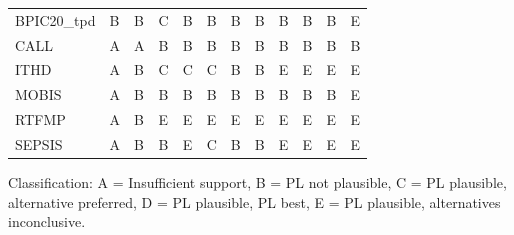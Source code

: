 \begin{tabular}{llllllllllll}
BPIC20\_tpd & \cellcolor[HTML]{D55E00} B & \cellcolor[HTML]{D55E00} B & \cellcolor[HTML]{E69F00} C & \cellcolor[HTML]{D55E00} B & \cellcolor[HTML]{D55E00} B & \cellcolor[HTML]{D55E00} B & \cellcolor[HTML]{D55E00} B & \cellcolor[HTML]{D55E00} B & \cellcolor[HTML]{D55E00} B & \cellcolor[HTML]{D55E00} B & \cellcolor[HTML]{56B4E9} E \\
       CALL & \cellcolor[HTML]{FFFFFF} A & \cellcolor[HTML]{FFFFFF} A & \cellcolor[HTML]{D55E00} B & \cellcolor[HTML]{D55E00} B & \cellcolor[HTML]{D55E00} B & \cellcolor[HTML]{D55E00} B & \cellcolor[HTML]{D55E00} B & \cellcolor[HTML]{D55E00} B & \cellcolor[HTML]{D55E00} B & \cellcolor[HTML]{D55E00} B & \cellcolor[HTML]{D55E00} B \\
       ITHD & \cellcolor[HTML]{FFFFFF} A & \cellcolor[HTML]{D55E00} B & \cellcolor[HTML]{E69F00} C & \cellcolor[HTML]{E69F00} C & \cellcolor[HTML]{E69F00} C & \cellcolor[HTML]{D55E00} B & \cellcolor[HTML]{D55E00} B & \cellcolor[HTML]{56B4E9} E & \cellcolor[HTML]{56B4E9} E & \cellcolor[HTML]{56B4E9} E & \cellcolor[HTML]{56B4E9} E \\
      MOBIS & \cellcolor[HTML]{FFFFFF} A & \cellcolor[HTML]{D55E00} B & \cellcolor[HTML]{D55E00} B & \cellcolor[HTML]{D55E00} B & \cellcolor[HTML]{D55E00} B & \cellcolor[HTML]{D55E00} B & \cellcolor[HTML]{D55E00} B & \cellcolor[HTML]{D55E00} B & \cellcolor[HTML]{D55E00} B & \cellcolor[HTML]{D55E00} B & \cellcolor[HTML]{56B4E9} E \\
      RTFMP & \cellcolor[HTML]{FFFFFF} A & \cellcolor[HTML]{D55E00} B & \cellcolor[HTML]{56B4E9} E & \cellcolor[HTML]{56B4E9} E & \cellcolor[HTML]{56B4E9} E & \cellcolor[HTML]{56B4E9} E & \cellcolor[HTML]{56B4E9} E & \cellcolor[HTML]{56B4E9} E & \cellcolor[HTML]{56B4E9} E & \cellcolor[HTML]{56B4E9} E & \cellcolor[HTML]{56B4E9} E \\
     SEPSIS & \cellcolor[HTML]{FFFFFF} A & \cellcolor[HTML]{D55E00} B & \cellcolor[HTML]{D55E00} B & \cellcolor[HTML]{56B4E9} E & \cellcolor[HTML]{E69F00} C & \cellcolor[HTML]{D55E00} B & \cellcolor[HTML]{D55E00} B & \cellcolor[HTML]{56B4E9} E & \cellcolor[HTML]{56B4E9} E & \cellcolor[HTML]{56B4E9} E & \cellcolor[HTML]{56B4E9} E \\
\bottomrule
\end{tabular}
\begin{center}\footnotesize
Classification: A = Insufficient support, B = PL not plausible, C = PL plausible, alternative preferred, D = PL plausible, PL best, E = PL plausible, alternatives inconclusive.
\end{center}
